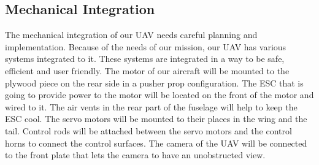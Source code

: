\documentclass[12pt]{article}
\begin{document}
\subsection{Mechanical Integration}
The mechanical integration of our UAV needs careful planning and implementation. Because of the needs of our mission, our UAV has various systems integrated to it. These systems are integrated in a way to be safe, efficient and user friendly. The motor of our aircraft will be mounted to the plywood piece on the rear side in a pusher prop configuration. The ESC that is going to provide power to the motor will be located on the front of the motor and wired to it. The air vents in the rear part of the fuselage will help to keep the ESC cool. The servo motors will be mounted to their places in the wing and the tail. Control rods will be attached between the servo motors and the control horns to connect the control surfaces. The camera of the UAV will be connected to the front plate that lets the camera to have an unobstructed view. \\
\end{document}
